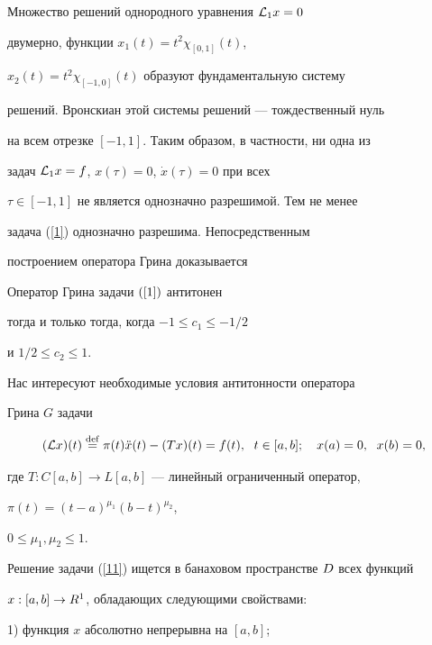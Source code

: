 Множество решений однородного уравнения ${\cal L}_1 x=0$


двумерно, функции $x_1(t)=t^2\chi_{[0,1]}(t)$,


$x_2(t)=t^2\chi_{[-1,0]}(t)$ образуют фундаментальную систему


решений. Вронскиан этой системы решений --- тождественный нуль


на всем отрезке $[-1,1]$. Таким образом, в частности, ни одна из


задач ${\cal L}_1x=f$, $x(\tau)=0$, $\Dot x(\tau)=0$ при всех


$\tau\in[-1,1]$ не является однозначно разрешимой. Тем не менее


задача (\ref{1}) однозначно разрешима. Непосредственным


построением оператора Грина доказывается





\begin{thms}


Оператор Грина задачи $(\ref{1})$ антитонен


тогда и только тогда, когда $-1\le c_1\le-1/2$


и $1/2\le c_2\le1$.


\end{thms}





Нас интересуют необходимые условия антитонности оператора


Грина $G$ задачи


\begin{equation}


\label{11}


(\L x)(t)\df\pi(t) \Ddot x(t)-(Tx)(t)=f(t),\ \; t\in[a,b];\quad


x(a)=0,\ \; x(b)=0,


\end{equation}


где $T:C[a,b]\to L[a,b]$ --- линейный ограниченный оператор,


$\pi(t)=(t-a)^{\mu_1}(b-t)^{\mu_2}$,


$0\le\mu_1, \mu_2\le1$.


Решение задачи (\ref{11}) ищется в банаховом пространстве $D$ всех функций


$x:[a,b]\to {R}^1$, обладающих следующими свойствами:





1) функция $x$ абсолютно непрерывна на $[a,b]$;





